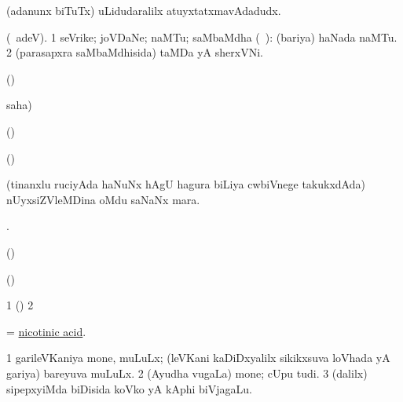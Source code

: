 \bentry
{}
\gl{\nA}
\bmng
(adanunx biTuTx) uLidudaralilx atuyxtatxmavAdadudx. 
\emng
\eentry

\bentry
{}
\gl{\nA}
\bmng
(\bava\ adeV). 
\bnum
\num{1} seVrike; joVDaNe; naMTu; saMbaMdha (\sA\ \rUpa): (bariya) haNada naMTu. 
\num{2} (parasapxra saMbaMdhisida) taMDa yA sherxVNi. 
\enum
\emng
\eentry

\bentry
{}
\gl{\saMkiSx}
\bmng
(\birx)  
\emng
\eentry

\bentry
{}
\gl{\saMkiSx}
\bmng
{} saha)  
\emng
\eentry

\bentry
{}
\gl{\saMkiSx}
\bmng
(\birx)  
\emng
\eentry

\bentry
{}
\gl{\saMkiSx}
\bmng
\emng
\eentry

\bentry
{}
\gl{\saMkiSx}
\bmng
(\birx)  
\emng
\eentry

\bentry
{}
\gl{\nA}
\bmng
(tinanxlu ruciyAda haNuNx hAgU hagura biLiya cwbiVnege takukxdAda) nUyxsiZVleMDina oMdu saNaNx mara. 
\emng
\eentry

\bentry
{}
\gl{\saMkiSx}
\bmng
{}. 
\emng
\eentry

\bentry
{}
\gl{\saMkiSx}
\bmng
{} 
\emng
\eentry

\bentry
{}
\gl{\saMkiSx}
\bmng
(\birx)  
\emng
\eentry

\bentry
{}
\gl{\saMkiSx}
\bmng
(\birx)  
\emng
\eentry

\bentry
{}
\gl{\saMkiSx}
\bmng
\bnum
\num{1} (\birx)  
\num{2}  
\enum
\emng
\eentry

\bentry
{}
\gl{\nA}
\bmng
= \hyperlink{nicotinic acid}{nicotinic acid}. 
\emng
\eentry

\bentry
{}
\gl{\nA}
\bmng
\bnum
\num{1} garileVKaniya mone, muLuLx; (leVKani kaDiDxyalilx sikikxsuva loVhada yA gariya) bareyuva muLuLx. 
\num{2} (Ayudha \mo vugaLa) mone; cUpu tudi. 
\num{3} (\bava dalilx) sipepxyiMda biDisida koVko yA kAphi biVjagaLu. 
\enum
\emng
\eentry


